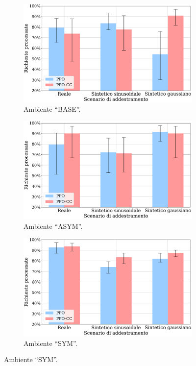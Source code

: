 \begin{figure}
    \centering

    \begin{subfigure}{.8\textwidth}
        \centering
        \includegraphics[width=\linewidth]{assets/5/results/eval_BASE_summary_processed_requests.pdf}
        \caption{Ambiente ``BASE''.}
    \end{subfigure}
    
    \begin{subfigure}{.8\textwidth}
        \centering
        \includegraphics[width=\linewidth]{assets/5/results/eval_ASYM_summary_processed_requests.pdf}
        \caption{Ambiente ``ASYM''.}
    \end{subfigure}
    
    \begin{subfigure}{.8\textwidth}
        \centering
        \includegraphics[width=\linewidth]{assets/5/results/eval_SYM_summary_processed_requests.pdf}
        \caption{Ambiente ``SYM''.}
    \end{subfigure}
    

\end{figure}
